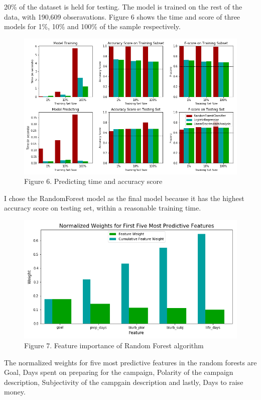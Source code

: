 \documentclass[11pt]{article}
\makeatletter
\def\maxwidth{\ifdim\Gin@nat@width>\linewidth\linewidth
    \else\Gin@nat@width\fi}
\let\Oldincludegraphics\includegraphics
\renewcommand{\includegraphics}[1]{\Oldincludegraphics[width=.8\maxwidth]{#1}}
\makeatother
\begin{document}
20\% of the dataset is held for testing. The model is trained on the
rest of the data, with 190,609 obseravations. Figure 6 shows the time
and score of three models for 1\%, 10\% and 100\% of the sample
respectively.

\begin{figure}
\centering
\includegraphics{plots/result.png}
\caption{Figure 6. Predicting time and accuracy score}
\end{figure}

I chose the RandomForest model as the final model because it has the
highest accuracy score on testing set, within a reasonable training
time.

\begin{figure}
\centering
\includegraphics{plots/rf_imp.png}
\caption{Figure 7. Feature importance of Random Forest algorithm}
\end{figure}

The normalized weights for five most predictive features in the random
forests are Goal, Days spent on preparing for the campaign, Polarity of
the campaign description, Subjectivity of the campgain description and
lastly, Days to raise money.
\end{document}
